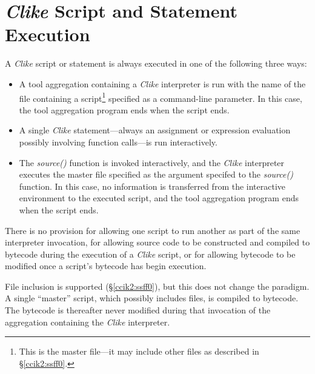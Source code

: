 \section{\emph{Clike} Script and Statement Execution}
\label{ccik2:ssfi0}

A \emph{Clike} script or statement is always executed in one of the following three ways:

\begin{itemize}
   \item A tool aggregation containing a \emph{Clike} interpreter is run with
         the name of the file containing a script\footnote{This is the master file---it may
         include other files as described in \S{}\ref{ccik2:ssff0}.} specified as a command-line
         parameter.  In this case, the tool aggregation program ends when the script
         ends.
   \item A single \emph{Clike} statement---always an assignment or expression evaluation
         possibly involving function calls---is run interactively.
   \item The \emph{source()} function is invoked interactively, and the 
         \emph{Clike} interpreter executes the master file specified as the argument
         specifed to the \emph{source()} function.  In this case, no information
         is transferred from the interactive environment to the executed script, and the
         tool aggregation program ends when the script ends.
\end{itemize}

There is no provision for allowing one script to run another as part of the same
interpreter invocation, for allowing source code to be constructed and compiled to
bytecode during the execution of a \emph{Clike} script, or for allowing bytecode
to be modified once a script's bytecode has begin execution.

File inclusion is supported (\S{}\ref{ccik2:ssff0}), but this does not change
the paradigm.  A single
``master'' script, which possibly includes files, is compiled to bytecode.
The bytecode is thereafter never modified during that invocation of the 
aggregation containing the \emph{Clike} interpreter.


